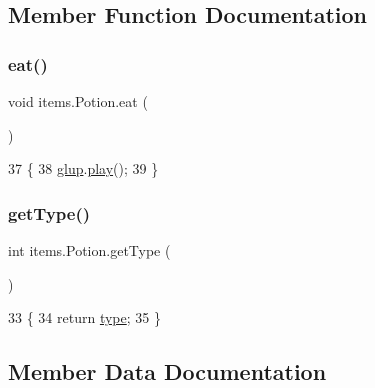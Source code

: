 \subsection{Member Function Documentation}
\mbox{\label{classitems_1_1_potion_a33ab3390826ef43ddfa94fc812e53afe}} 
\subsubsection{\texorpdfstring{eat()}{eat()}}
{\footnotesize\ttfamily void items.\+Potion.\+eat (\begin{DoxyParamCaption}{ }\end{DoxyParamCaption})\hspace{0.3cm}{\ttfamily [inline]}}


\begin{DoxyCode}
37                      \{
38         \mbox{\hyperlink{classitems_1_1_potion_a4f366c06faf54019df1c647f470b4f66}{glup}}.\mbox{\hyperlink{classorg_1_1newdawn_1_1slick_1_1_sound_aed5db39a69e8ed57eb14053f7588ab90}{play}}();
39     \}
\end{DoxyCode}
\mbox{\label{classitems_1_1_potion_a6c04f56c990c3782b5786252bb73545e}} 
\subsubsection{\texorpdfstring{get\+Type()}{getType()}}
{\footnotesize\ttfamily int items.\+Potion.\+get\+Type (\begin{DoxyParamCaption}{ }\end{DoxyParamCaption})\hspace{0.3cm}{\ttfamily [inline]}}


\begin{DoxyCode}
33     \{
34         \textcolor{keywordflow}{return} \mbox{\hyperlink{classitems_1_1_potion_a9f9bc89fd8dfdadc0fa0101b725c524e}{type}};
35     \}
\end{DoxyCode}


\subsection{Member Data Documentation}
\mbox{\label{classitems_1_1_potion_ac52a6d60f2a804077f3850d4e3d18134}} 
